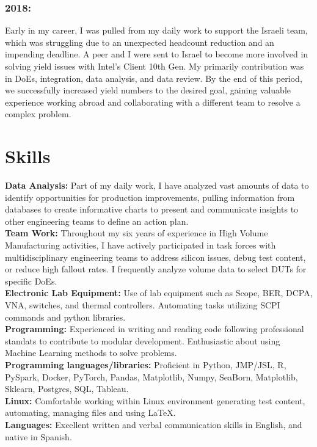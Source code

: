 \documentclass{article}
\begin{document}
\subsubsection{2018:}
Early in my career, I was pulled from my daily work to support the Israeli team, which was struggling due to an unexpected headcount reduction and an impending deadline. A peer and I were sent to Israel to become more involved in solving yield issues with Intel's Client 10th Gen. My primarily contribution was in DoEs, integration, data analysis, and data review. By the end of this period, we successfully increased yield numbers to the desired goal, gaining valuable experience working abroad and collaborating with a different team to resolve a complex problem.

\section{Skills}
\noindent\textbf{Data Analysis:} Part of my daily work, I have analyzed vast amounts of data to identify opportunities for production improvements, pulling information from databases to create informative charts to present and communicate insights to other engineering teams to define an action plan.\\
\textbf{Team Work:} Throughout my six years of experience in High Volume Manufacturing activities, I have actively participated in task forces with multidisciplinary engineering teams to address silicon issues, debug test content, or reduce high fallout rates. I frequently analyze volume data to select DUTs for specific DoEs.\\
\textbf{Electronic Lab Equipment:} Use of lab equipment such as Scope, BER, DCPA, VNA, switches, and thermal controllers. Automating tasks utilizing SCPI commands and python libraries.\\
\textbf{Programming:} Experienced in writing and reading code following professional standats to contribute to modular development. Enthusiastic about using Machine Learning methods to solve problems.\\
\textbf{Programming languages/libraries:} Proficient in Python, JMP/JSL, R, PySpark, Docker, PyTorch, Pandas, Matplotlib, Numpy, SeaBorn, Matplotlib, Sklearn, Postgres, SQL, Tableau.\\
\textbf{Linux:} Comfortable working within Linux environment generating test content, automating, managing files and using \LaTeX .\\
\textbf{Languages:} Excellent written and verbal communication skills in English, and native in Spanish.
\end{document}
